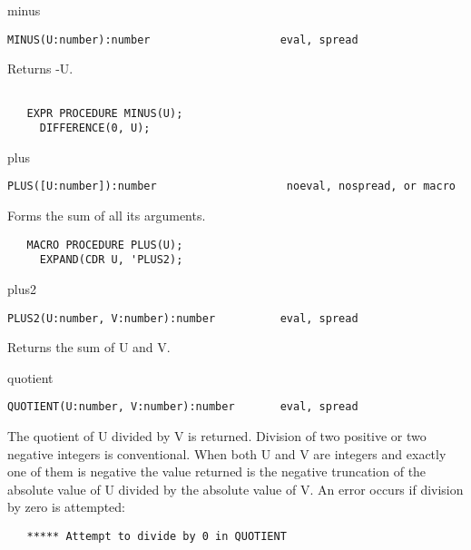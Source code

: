 \begin{Function}{minus}
\begin{verbatim}
MINUS(U:number):number                    eval, spread
\end{verbatim}
   Returns -U.
\begin{verbatim}

   EXPR PROCEDURE MINUS(U);
     DIFFERENCE(0, U);
\end{verbatim}
\end{Function}
\begin{Function}{plus}
\begin{verbatim}
PLUS([U:number]):number                    noeval, nospread, or macro
\end{verbatim}
   Forms the sum of all its arguments.
\begin{verbatim}
   MACRO PROCEDURE PLUS(U);
     EXPAND(CDR U, 'PLUS2);
\end{verbatim}
\end{Function}
\begin{Function}{plus2}
\begin{verbatim}
PLUS2(U:number, V:number):number          eval, spread
\end{verbatim}
   Returns the sum of U and V.

\end{Function}
\begin{Function}{quotient}
\begin{verbatim}
QUOTIENT(U:number, V:number):number       eval, spread
\end{verbatim}
   The  quotient of  U divided  by V  is returned.    Division of
   two  positive or two negative integers  is conventional.  When
   both  U and V are integers and exactly one of them is negative
   the  value returned is the negative truncation of the absolute
   value  of  U divided  by  the absolute  value of  V.  An error
   occurs if division by zero is attempted:
\begin{verbatim}
   ***** Attempt to divide by 0 in QUOTIENT
\end{verbatim}


\end{Function}
